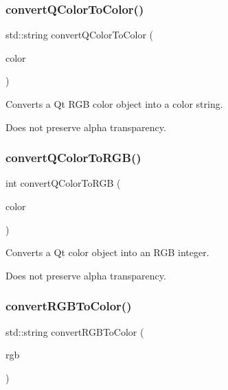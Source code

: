 \subsubsection{\texorpdfstring{convert\+Q\+Color\+To\+Color()}{convertQColorToColor()}}
{\footnotesize\ttfamily std\+::string convert\+Q\+Color\+To\+Color (\begin{DoxyParamCaption}\item[{const Q\+Color \&}]{color }\end{DoxyParamCaption})\hspace{0.3cm}{\ttfamily [static]}}



Converts a Qt R\+GB color object into a color string. 

Does not preserve alpha transparency. \mbox{\label{classGColor_a30f06933a10f00500d6b7991f8b61dde}} 
\subsubsection{\texorpdfstring{convert\+Q\+Color\+To\+R\+G\+B()}{convertQColorToRGB()}}
{\footnotesize\ttfamily int convert\+Q\+Color\+To\+R\+GB (\begin{DoxyParamCaption}\item[{const Q\+Color \&}]{color }\end{DoxyParamCaption})\hspace{0.3cm}{\ttfamily [static]}}



Converts a Qt color object into an R\+GB integer. 

Does not preserve alpha transparency. \mbox{\label{classGColor_a64353dd79967412aeebe46219e4a71df}} 
\subsubsection{\texorpdfstring{convert\+R\+G\+B\+To\+Color()}{convertRGBToColor()}\hspace{0.1cm}{\footnotesize\ttfamily [1/2]}}
{\footnotesize\ttfamily std\+::string convert\+R\+G\+B\+To\+Color (\begin{DoxyParamCaption}\item[{int}]{rgb }\end{DoxyParamCaption})\hspace{0.3cm}{\ttfamily [static]}}



